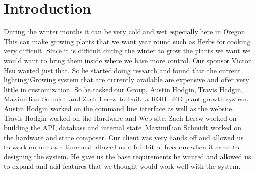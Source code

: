 \documentclass[onecolumn, draftclsnofoot,10pt, compsoc]{IEEEtran}
\begin{document}
\newpage

\tableofcontents
\listoffigures
\clearpage
\singlespace

\newpage




	\section{Introduction} %

	During the winter months it can be very cold and wet especially here in Oregon. This can make growing plants that we want year 
	round such as Herbs for cooking very difficult. Since it is difficult during the winter to grow the plants we want we would want
	to bring them inside where we have more control. Our sponsor Victor Hsu wanted just that. So he started doing research and found 
	that the current lighting/Growing system that are currently available are expensive and offer very little in customization. So he 
	tasked our Group, Austin Hodgin, Travis Hodgin, Maximillian Schmidt and Zach Lerew to build a RGB LED plant growth system. Austin Hodgin worked 
	on the command line interface as well as the website. Travis Hodgin worked on the Hardware and Web site. Zach Lerew worked on building the API, database
	and internal state. Maximillian Schmidt worked on the hardware and state composer. Our client was very hands off and allowed us to work on our own time 
	and allowed us a fair bit of freedom when it came to designing the system. He gave us the base requirements he wanted and allowed us to expand and add features
	that we thought would work well with the system. 
\end{document}
